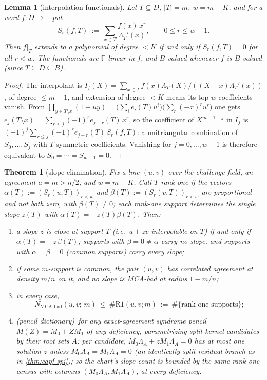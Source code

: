 \documentclass[11pt]{article}
\newtheorem{theorem}{Theorem}[section]
\newtheorem{lemma}[lemma]{Lemma}
\theoremstyle{definition}
\theoremstyle{remark}
\newcommand{\F}{\mathbb{F}}
\newcommand{\B}{B}
\begin{document}
\begin{lemma}[interpolation functionals]\label{lem:capfp-functionals}
Let $T\subseteq D$, $|T|=m$, $w=m-K$, and for a word $f:D\to\F$ put
\[
        S_r(f,T)\ :=\ \sum_{x\in T}\frac{f(x)\,x^r}{\Lambda_T'(x)},\qquad 0\le r\le w-1 .
\]
Then $f|_T$ extends to a polynomial of degree $<K$ if and only if $S_r(f,T)=0$ for all $r<w$.  The functionals are $\F$-linear in $f$, and $\B$-valued whenever $f$ is $\B$-valued \textup(since $T\subseteq D\subseteq\B$\textup).
\end{lemma}

\begin{proof}
The interpolant is $I_f(X)=\sum_{x\in T}f(x)\Lambda_T(X)/((X-x)\Lambda_T'(x))$, of degree $\le m-1$, and extension of degree $<K$ means its top $w$ coefficients vanish.  From $\prod_{y\in T\setminus x}(1+uy)=\bigl(\sum_ie_i(T)u^i\bigr)\bigl(\sum_r(-x)^ru^r\bigr)$ one gets $e_j(T\setminus x)=\sum_{r\le j}(-1)^re_{j-r}(T)\,x^r$, so the coefficient of $X^{m-1-j}$ in $I_f$ is $(-1)^j\sum_{r\le j}(-1)^re_{j-r}(T)\,S_r(f,T)$: a unitriangular combination of $S_0,\ldots,S_j$ with $T$-symmetric coefficients.  Vanishing for $j=0,\ldots,w-1$ is therefore equivalent to $S_0=\cdots=S_{w-1}=0$.
\end{proof}

\begin{theorem}[slope elimination]\label{thm:capfp-slope-elim}
Fix a line $(u,v)$ over the challenge field, an agreement $a=m>n/2$, and $w=m-K$.  Call $T$ \emph{rank-one} if the vectors $\alpha(T):=(S_r(u,T))_{r<w}$ and $\beta(T):=(S_r(v,T))_{r<w}$ are proportional and not both zero, with $\beta(T)\ne0$; each rank-one support determines the single slope $z(T)$ with $\alpha(T)=-z(T)\beta(T)$.  Then:
\begin{enumerate}[label=\textup{(\alph*)}]
\item a slope $z$ is close at support $T$ \textup(i.e.\ $u+zv$ interpolable on $T$\textup) if and only if $\alpha(T)=-z\,\beta(T)$; supports with $\beta=0\ne\alpha$ carry no slope, and supports with $\alpha=\beta=0$ \textup(\emph{common} supports\textup) carry every slope;
\item if some $m$-support is common, the pair $(u,v)$ has correlated agreement at density $m/n$ on it, and \emph{no} slope is MCA-bad at radius $1-m/n$;
\item in every case,
\[
        N_{\mathrm{MCA\text{-}bad}}(u,v;\,m)\ \le\ \#\mathrm{R1}(u,v;m)\ :=\ \#\{\text{rank-one supports}\};
\]
\item \textup(pencil dictionary\textup)\ for any exact-agreement syndrome pencil $M(Z)=M_0+ZM_1$ of \emph{any} deficiency, parametrizing split kernel candidates by their root sets $A$: per candidate, $M_0\Lambda_A+zM_1\Lambda_A=0$ has at most one solution $z$ unless $M_0\Lambda_A=M_1\Lambda_A=0$ \textup(an identically-split residual branch as in \cref{thm:capf-spi}\textup); so the chart's slope count is bounded by the same rank-one census with columns $(M_0\Lambda_A,M_1\Lambda_A)$, at every deficiency.
\end{enumerate}
\end{theorem}
\end{document}
